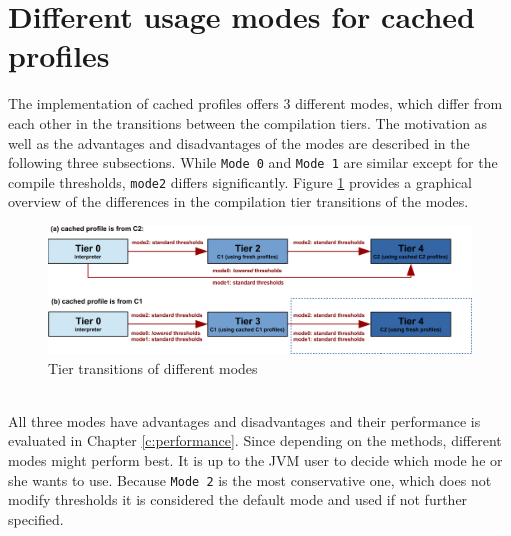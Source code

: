 \section{Different usage modes for cached profiles}
\label{s:cacheprofilesmode}
The implementation of cached profiles offers 3 different modes, which differ from each other in the transitions between the compilation tiers.
The motivation as well as the advantages and disadvantages of the modes are described in the following three subsections.
While \texttt{Mode 0} and \texttt{Mode 1} are similar except for the compile thresholds, \texttt{mode2} differs significantly.
Figure \ref{f:hs_tiers_thresholds} provides a graphical overview of the differences in the compilation tier transitions of the modes.
\begin{figure}[h]
  \begin{center}
    \centering
    \includegraphics{figures/hs_tiers_threshold.png}
    \caption{Tier transitions of different modes}
    \label{f:hs_tiers_thresholds}
  \end{center}
\end{figure}\\
All three modes have advantages and disadvantages and their performance is evaluated in Chapter \ref{c:performance}. Since depending on the methods, different modes might perform best. It is up to the JVM user to decide which mode he or she wants to use. Because \texttt{Mode 2} is the most conservative one, which does not modify thresholds it is considered the default mode and used if not further specified.

